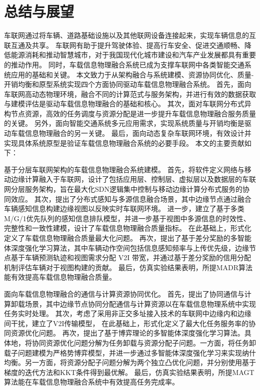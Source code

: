 \chapter[\hspace{0pt}总结与展望]{{\hspace{-5pt}总结与展望}}\label{section 6}
\removelofgap
\removelotgap
车联网通过将车辆、道路基础设施以及其他联网设备连接起来，实现车辆信息的互联互通及共享。
车联网有助于提升驾驶体验、提高行车安全、促进交通顺畅、降低能源消耗和推动智慧城市，对于我国现代化城市建设和汽车产业发展都具有重要的推动作用。
同时，车载信息物理融合系统已成为支撑车联网中各类智能交通系统应用的基础和关键。
本文致力于从架构融合与系统建模、资源协同优化、质量-开销均衡和原型系统实现四个方面协同驱动车载信息物理融合系统。
首先，面向车联网高动态物理环境，融合不同的计算范式与服务架构，并进行有效的数据获取与建模评估是驱动车载信息物理融合的基础和核心。
其次，面对车联网分布式异构节点资源，高效的任务调度与资源分配是进一步提升车载信息物理融合服务质量的关键。
另外，面向智能交通系统多元应用需求，实现系统质量与开销均衡是驱动车载信息物理融合的另一关键。
最后，面向动态复杂车联网环境，有效设计并实现具体系统原型是验证车载信息物理融合系统的必要手段。
本文的主要贡献如下：

 基于分层车联网架构的车载信息物理融合系统建模。
首先，将软件定义网络与移动边缘计算融入于车联网，设计了包括应用层、控制层、虚拟层以及数据层的车联网分层服务架构，旨在最大化SDN逻辑集中控制与移动边缘计算分布式服务的协同效应。
其次，提出了分布式感知与多源信息融合场景，其中边缘节点通过融合车辆感知信息构建边缘视图以反映实时车联网环境。
进一步，建立了基于多类M/G/1优先队列的感知信息排队模型，并进一步基于视图中多源信息的时效性、完整性和一致性建模，设计了车载信息物理融合质量指标。
在此基础上，形式化定义了车载信息物理融合质量最大化问题。
再次，提出了基于差分奖励的多智能体深度强化学习算法，其中车辆动作空间包括信息感知频率与上传优先级，边缘节点基于车辆预测轨迹和视图需求分配 V2I 带宽，并通过基于差分奖励的信用分配机制评估车辆对于视图构建的贡献。
最后，仿真实验结果表明，所提MADR算法能有效提高车载信息物理融合质量。

 面向车载信息物理融合的通信与计算资源协同优化。
首先，提出了协同通信与计算卸载场景，其中边缘节点协同分配通信与计算资源以在车载信息物理系统中实现任务实时处理。
其次，考虑了采用非正交多址接入技术的车联网中边缘内和边缘间干扰，建立了V2I传输模型，
在此基础上，形式化定义了最大化任务服务率的协同资源优化问题。
再次，提出了基于博弈理论的多智能体深度强化学习算法。具体地，将协同资源优化问题分解为任务卸载与资源分配子问题。一方面，将任务卸载子问题建模为严格势博弈模型，并进一步通过多智能体深度强化学习来实现纳什均衡。另一方面，将资源分配子问题分解为两个独立凸优化问题，并分别使用基于梯度的迭代方法和KKT条件得到最优解。
最后，仿真实验结果表明，所提MAGT算法能在车载信息物理融合系统中有效提高任务完成率。

